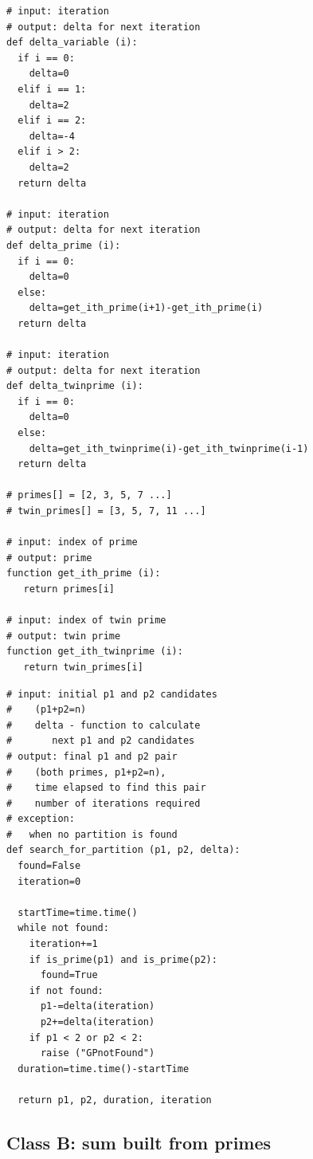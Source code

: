\documentclass[10pt,twocolumn]{article}
\begin{document}
\lstset{language=Python}
\lstset{breaklines=true}
\lstset{frame=shadowbox}
\begin{lstlisting}[linewidth=8.7cm]
# input: iteration
# output: delta for next iteration
def delta_variable (i):
  if i == 0:
    delta=0
  elif i == 1:
    delta=2
  elif i == 2:
    delta=-4
  elif i > 2:
    delta=2
  return delta

# input: iteration
# output: delta for next iteration
def delta_prime (i):
  if i == 0:
    delta=0
  else:
    delta=get_ith_prime(i+1)-get_ith_prime(i)
  return delta

# input: iteration
# output: delta for next iteration
def delta_twinprime (i):
  if i == 0:
    delta=0
  else:
    delta=get_ith_twinprime(i)-get_ith_twinprime(i-1)
  return delta

# primes[] = [2, 3, 5, 7 ...]
# twin_primes[] = [3, 5, 7, 11 ...]

# input: index of prime
# output: prime
function get_ith_prime (i):
   return primes[i]

# input: index of twin prime
# output: twin prime
function get_ith_twinprime (i):
   return twin_primes[i]

\end{lstlisting}

\lstset{language=Python}
\lstset{breaklines=true}
\lstset{frame=shadowbox}
\begin{lstlisting}[linewidth=8.7cm]
# input: initial p1 and p2 candidates
#    (p1+p2=n)
#    delta - function to calculate
#       next p1 and p2 candidates
# output: final p1 and p2 pair 
#    (both primes, p1+p2=n),
#    time elapsed to find this pair
#    number of iterations required
# exception:
#   when no partition is found
def search_for_partition (p1, p2, delta):
  found=False
  iteration=0
    
  startTime=time.time()
  while not found:
    iteration+=1
    if is_prime(p1) and is_prime(p2):
      found=True
    if not found:
      p1-=delta(iteration)
      p2+=delta(iteration)
    if p1 < 2 or p2 < 2:
      raise ("GPnotFound")
  duration=time.time()-startTime

  return p1, p2, duration, iteration
\end{lstlisting}

\subsection{Class B: sum built from primes}
\end{document}
